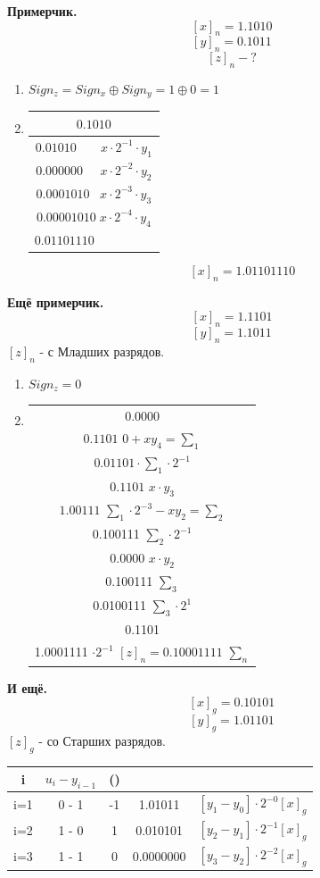 \documentclass[12px]{article}
\begin{document}
\textbf{Примерчик.}\\
\[ [x]_n = 1.1010 \]
\[ [y]_n = 0.1011 \]
\[ [z]_n - ? \]
\begin{enumerate}
	\item $Sign_z = Sign_x \oplus Sign_y = 1 \oplus 0 = 1$ 
	\item \begin{tabular}{c}
		$ 0.1010 $\\
		\hline
		$ 0.01010 \;\;\;\;\;\;\; x \cdot 2^{-1} \cdot y_1$\\
		$ 0.000000\;\;\;\;\; x \cdot 2^{-2} \cdot y_2 $\\
		$ 0.0001010\;\;\; x \cdot 2^{-3} \cdot y_3 $\\
		$ 0.00001010\; x \cdot 2^{-4} \cdot y_4 $\\
		\hline
		$0.01101110 \;\;\;\;\;\;\;\;\;\;\;\;\;\;\;\;\;$ 
	\end{tabular}
	\[ [x]_n = 1.01101110 \]
\end{enumerate}

\textbf{Ещё примерчик.}
\[ [x]_n = 1.1101 \]
\[ [y]_n = 1.1011 \]
$ [z]_n$ - с Младших разрядов. 
\begin{enumerate}
	\item $Sign_z = 0$
	\item \begin{tabular}{c}	
		$0.0000$\\
		$0.1101$   $0 + x y_4 = \sum_1$\\
		\hline 
		$0.01101 \cdot \sum_1 \cdot 2^{-1}$\\
		$0.1101$   $x\cdot y_3$ \\
		\hline
		$1.00111$   $\sum_1 \cdot 2^{-3} - xy_2 = \sum_2$\\
		0.100111   $\sum_2 \cdot 2^{-1}$\\
		0.0000    $x \cdot y_2$\\
		\hline 
		0.100111   $\sum_3$\\
		0.0100111  $\sum_3 \cdot 2^{1}$\\
		0.1101\\
		\hline 
		1.0001111  $\cdot 2^{-1}$
		$[z]_n = 0.10001111$  $\sum_n$
	\end{tabular}
\end{enumerate}

\textbf{И ещё.}\\
\[ [x]_g = 0.10101 \]
\[ [y]_g = 1.01101 \]
$ [z]_g$ - со Старших разрядов. \\
\begin{tabular}{c | c | c| c | c}
	i & $u_i-y_{i-1}$ & () & & \\
	\hline
	i=1 & 0 - 1 & -1 & 1.01011 & $[y_1-y_0] \cdot 2^{-0} [x]_g$\\
	i=2 & 1 - 0 & 1 &  0.010101 & $[y_2-y_1] \cdot 2^{-1} [x]_g$\\
	i=3 & 1 - 1 & 0 &  0.0000000 & $[y_3-y_2] \cdot 2^{-2} [x]_g$\\
\end{tabular}
\end{document}
